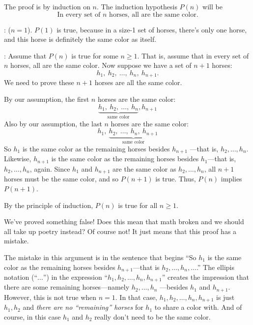\begin{bogusproof}

The proof is by induction on $n$.  The induction hypothesis $P(n)$
will be
\begin{equation}\label{horsehyp}
\text{In every set of $n$ horses, all are the same color.}
\end{equation}

: ($n=1$).  $P(1)$ is true, because in a
size-1 set of horses, there's only one horse, and this horse is
definitely the same color as itself.

: Assume that $P(n)$ is true for some $n \geq 1$.
That is, assume that in every set of $n$ horses, all are the same color.
Now suppose we have a set of $n+1$ horses:
\[
h_1,\ h_2,\ \dots,\ h_n,\ h_{n+1}.
\]
We need to prove these $n+1$ horses are all the same color.

By our assumption, the first $n$ horses are the same color:
\[
\underbrace{h_1,\ h_2,\ \dots,\ h_n}_{\text{same color}}, h_{n+1}
\]
Also by our assumption, the last $n$ horses are the same color:
\[
h_1,\ \underbrace{h_2,\ \dots,\ h_n,\ h_{n+1}}_{\text{same color}}
\]
So $h_1$ is the same color as the remaining horses besides $h_{n+1}$
---that is, $h_2, \dots, h_n$.  Likewise, $h_{n+1}$ is the same
color as the remaining horses besides $h_1$---that is, $h_2, \dots,
h_n$, again.  Since $h_1$ and $h_{n+1}$ are the same color as $h_2,
\dots, h_n$, all $n+1$ horses must be the same color, and so $P(n+1)$
is true.  Thus, $P(n)$ implies $P(n+1)$.

By the principle of induction, $P(n)$ is true for all $n \geq 1$.
\end{bogusproof}
We've proved something false!  Does this mean that math broken and we
should all take up poetry instead?  Of course not!  It just means
that this proof has a mistake.

\iffalse

\textbf{See if you can figure it out before we take it up in class.}
\fi



The mistake in this argument is in the sentence that begins ``So $h_1$
is the same color as the remaining horses besides $h_{n+1}$---that is
$h_2, \dots, h_n, \dots$.''  The ellipis notation (``$\dots$'') in the
expression ``$h_1, h_2, \dots, h_n, h_{n+1}$'' creates the impression
that there are some remaining horses---namely $h_2, \dots, h_n$
---besides $h_1$ and $h_{n+1}$.  However, this is not true when $n =
1$.  In that case, $h_1, h_2, \dots, h_n, h_{n+1}$ is just $h_1, h_2$
and \emph{there are no ``remaining'' horses} for $h_1$ to share a
color with.  And of course, in this case $h_1$ and $h_2$ really don't
need to be the same color.


